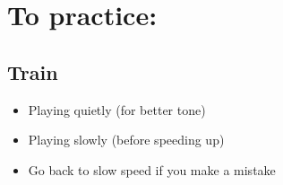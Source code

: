 \section{To practice:}
    \subsection{Train}
        \begin{itemize}
            \item Playing quietly (for better tone)
            \item Playing slowly (before speeding up)
            \item Go back to slow speed if you make a mistake
        \end{itemize}